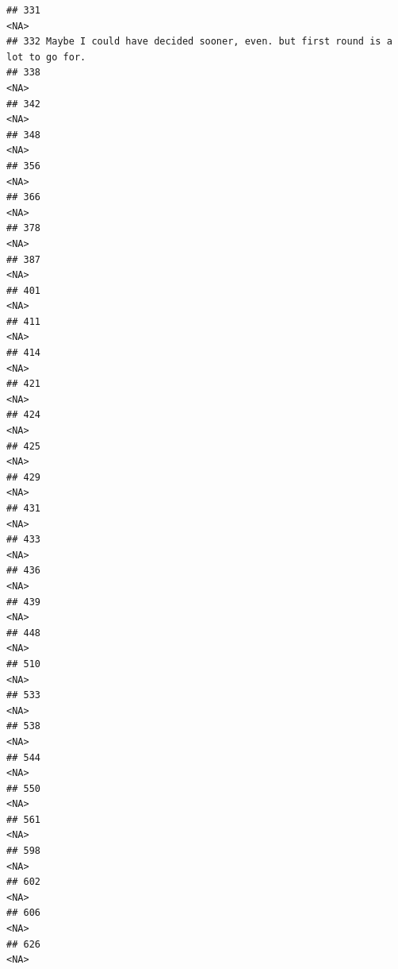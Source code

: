 \documentclass[
]{article}
\begin{document}
\begin{verbatim}
## 331                                                                         <NA>
## 332 Maybe I could have decided sooner, even. but first round is a lot to go for.
## 338                                                                         <NA>
## 342                                                                         <NA>
## 348                                                                         <NA>
## 356                                                                         <NA>
## 366                                                                         <NA>
## 378                                                                         <NA>
## 387                                                                         <NA>
## 401                                                                         <NA>
## 411                                                                         <NA>
## 414                                                                         <NA>
## 421                                                                         <NA>
## 424                                                                         <NA>
## 425                                                                         <NA>
## 429                                                                         <NA>
## 431                                                                         <NA>
## 433                                                                         <NA>
## 436                                                                         <NA>
## 439                                                                         <NA>
## 448                                                                         <NA>
## 510                                                                         <NA>
## 533                                                                         <NA>
## 538                                                                         <NA>
## 544                                                                         <NA>
## 550                                                                         <NA>
## 561                                                                         <NA>
## 598                                                                         <NA>
## 602                                                                         <NA>
## 606                                                                         <NA>
## 626                                                                         <NA>

\end{verbatim}
\end{document}

